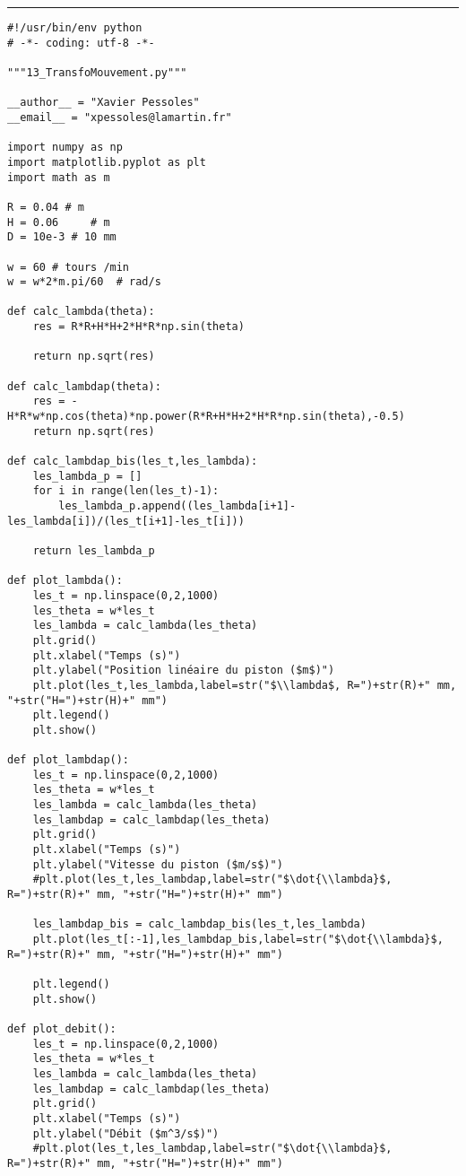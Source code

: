 \noindent\hrule
\begin{lstlisting}
#!/usr/bin/env python
# -*- coding: utf-8 -*-

"""13_TransfoMouvement.py"""

__author__ = "Xavier Pessoles"
__email__ = "xpessoles@lamartin.fr"

import numpy as np
import matplotlib.pyplot as plt
import math as m

R = 0.04 # m
H = 0.06     # m
D = 10e-3 # 10 mm

w = 60 # tours /min
w = w*2*m.pi/60  # rad/s

def calc_lambda(theta):
    res = R*R+H*H+2*H*R*np.sin(theta)
    
    return np.sqrt(res)

def calc_lambdap(theta):
    res = -H*R*w*np.cos(theta)*np.power(R*R+H*H+2*H*R*np.sin(theta),-0.5)
    return np.sqrt(res)

def calc_lambdap_bis(les_t,les_lambda):
    les_lambda_p = []
    for i in range(len(les_t)-1):
        les_lambda_p.append((les_lambda[i+1]-les_lambda[i])/(les_t[i+1]-les_t[i]))
        
    return les_lambda_p

def plot_lambda():
    les_t = np.linspace(0,2,1000)
    les_theta = w*les_t
    les_lambda = calc_lambda(les_theta)
    plt.grid()
    plt.xlabel("Temps (s)")
    plt.ylabel("Position linéaire du piston ($m$)")
    plt.plot(les_t,les_lambda,label=str("$\\lambda$, R=")+str(R)+" mm, "+str("H=")+str(H)+" mm")
    plt.legend()
    plt.show()

def plot_lambdap():
    les_t = np.linspace(0,2,1000)
    les_theta = w*les_t
    les_lambda = calc_lambda(les_theta)
    les_lambdap = calc_lambdap(les_theta)
    plt.grid()
    plt.xlabel("Temps (s)")
    plt.ylabel("Vitesse du piston ($m/s$)")
    #plt.plot(les_t,les_lambdap,label=str("$\dot{\\lambda}$, R=")+str(R)+" mm, "+str("H=")+str(H)+" mm")
    
    les_lambdap_bis = calc_lambdap_bis(les_t,les_lambda)
    plt.plot(les_t[:-1],les_lambdap_bis,label=str("$\dot{\\lambda}$, R=")+str(R)+" mm, "+str("H=")+str(H)+" mm")

    plt.legend()
    plt.show()
    
def plot_debit():
    les_t = np.linspace(0,2,1000)
    les_theta = w*les_t
    les_lambda = calc_lambda(les_theta)
    les_lambdap = calc_lambdap(les_theta)
    plt.grid()
    plt.xlabel("Temps (s)")
    plt.ylabel("Débit ($m^3/s$)")
    #plt.plot(les_t,les_lambdap,label=str("$\dot{\\lambda}$, R=")+str(R)+" mm, "+str("H=")+str(H)+" mm")
    

\end{lstlisting}
